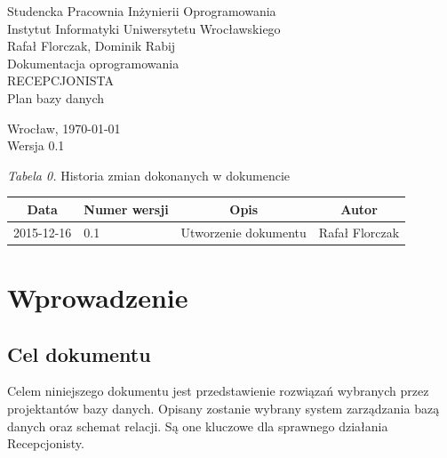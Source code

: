 \documentclass [11pt, a4paper, leqno] {article}
\begin{document}

\begin{center}
  \thispagestyle{empty} %
  {\large Studencka Pracownia Inżynierii Oprogramowania} \\ [0.5cm]
	{\large Instytut Informatyki Uniwersytetu Wrocławskiego} \\ [6.0cm]

  {\large Rafał Florczak, Dominik Rabij} \\ [1.5cm]

	{\huge Dokumentacja oprogramowania} \\ [0.5cm]
  {\huge RECEPCJONISTA} \\ [1.5cm]

  {\large Plan bazy danych} \\ [0.5cm]

  \vfill
  
  {\large Wrocław, \today} \\ [0.5cm]
  {\large Wersja 0.1}
\end{center}

\newpage


\textit{Tabela 0.} Historia zmian dokonanych w dokumencie

\begin{center}
  \begin{tabular}{| l | l | l | l |}
    \hline
    \multicolumn{1}{|c|}{Data} & 
    \multicolumn{1}{|c|}{Numer wersji} &  
    \multicolumn{1}{|c|}{Opis} &
    \multicolumn{1}{|c|}{Autor} \\ \hline \hline
    2015-12-16 & 0.1 & Utworzenie dokumentu & Rafał Florczak \\ \hline
  \end{tabular}
\end{center}

\medskip

\tableofcontents

\newpage

\section{Wprowadzenie}

\subsection{Cel dokumentu}
\noindent
Celem niniejszego dokumentu jest przedstawienie rozwiązań wybranych przez projektantów bazy danych. Opisany zostanie wybrany system zarządzania bazą danych oraz schemat relacji. Są one kluczowe dla sprawnego działania Recepcjonisty.
\end{document}
